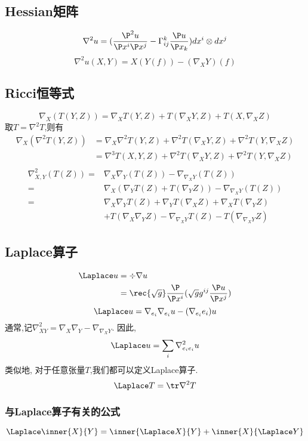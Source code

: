 \subsection{Hessian矩阵}
\begin{equation}
    \nabla^2u=(\frac{\P^2u}{\P x^i\P x^j}-\Gamma^k_{ij}\frac{\P u}{\P x_k})dx^i\otimes dx^j
\end{equation}
\begin{equation}
    \nabla^2u(X,Y)=X(Y(f))-(\nabla_XY)(f)
\end{equation}
\subsection{Ricci恒等式}
\begin{equation}
    \nabla_X(T(Y,Z))=\nabla_XT(Y,Z)+T(\nabla_XY,Z)+T(X,\nabla_XZ)
\end{equation}
取$T=\nabla^2T$,则有
\begin{equation}
    \begin{split}
        \nabla_X(\nabla^2T(Y,Z))&=\nabla_X\nabla^2T(Y,Z)+\nabla^2T(\nabla_XY,Z)+\nabla^2T(Y,\nabla_XZ)\\
        &=\nabla^3T(X,Y,Z)+\nabla^2T(\nabla_XY,Z)+\nabla^2T(Y,\nabla_XZ)\\
    \end{split}
\end{equation}
\begin{equation}
    \begin{split}
        \nabla^2_{X,Y}(T(Z))=&\nabla_X\nabla_Y(T(Z)) -\nabla_{\nabla_XY}(T(Z))\\
        =&\nabla_X(\nabla_YT(Z)+T(\nabla_YZ)) -\nabla_{\nabla_XY}(T(Z))\\
        =&\nabla_X\nabla_YT(Z)+\nabla_YT(\nabla_XZ)+\nabla_XT(\nabla_YZ) \\
        &+T(\nabla_X\nabla_YZ)-\nabla_{\nabla_XY}T(Z)-T(\nabla_{\nabla_XY}Z)
    \end{split}
\end{equation}
\subsection{Laplace算子}
\begin{equation}
    \begin{split}
        \Laplace u &=\div \nabla u \\
        &=\rec{\sqrt{g}}\frac{\P}{\P x^i}(\sqrt{g}g^{ij}\frac{\P u}{\P x^j}) 
    \end{split}
\end{equation}
\begin{equation}
    \Laplace u=\nabla_{e_i}\nabla_{e_i}u-(\nabla_{e_i}e_i)u
\end{equation}
通常,记$\nabla^2_{XY}=\nabla_X\nabla_Y-\nabla_{\nabla_XY}$. 因此,
\begin{equation}
    \Laplace u=\sum_i\nabla^2_{e_ie_i}u
\end{equation}
类似地, 对于任意张量$T$,我们都可以定义Laplace算子.
\begin{equation}
    \Laplace T=\tr \nabla^2 T
\end{equation}
\subsubsection{与Laplace算子有关的公式}
\begin{equation}
    \Laplace\inner{X}{Y}=\inner{\Laplace X}{Y}+\inner{X}{\Laplace Y}
\end{equation}